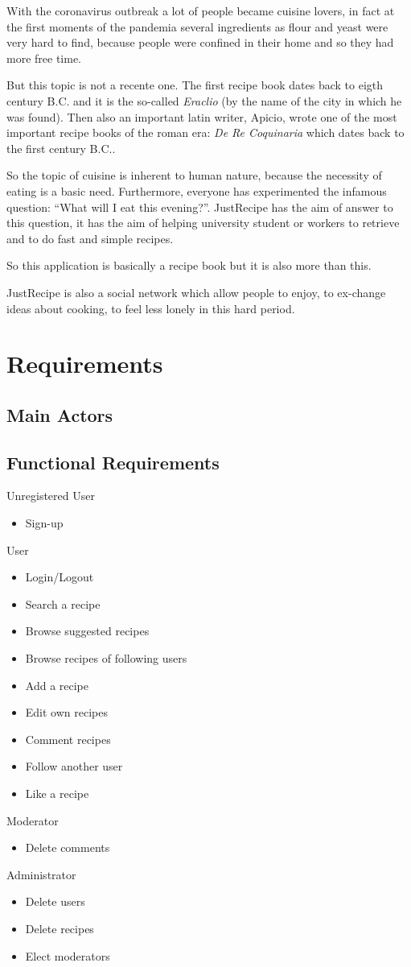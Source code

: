 \documentclass[a4paper]{report}
\begin{document}
\noindent With the coronavirus outbreak a lot of people became cuisine lovers, in fact at the first moments of the pandemia several ingredients as flour and yeast were very hard to find, because people were confined in their home and so they had more free time.

\noindent But this topic is not a recente one. The first recipe book dates back to eigth century B.C. and it is the so-called \emph{Eraclio} (by the name of the city in which he was found). Then also an important latin writer, Apicio, wrote one of the most important recipe books of the roman era: \emph{De Re Coquinaria} which dates back to the first century B.C..
 
\noindent So the topic of cuisine is inherent to human nature, because the necessity of eating is a basic need.
Furthermore, everyone has experimented the infamous question: “What will I eat this evening?”. JustRecipe has the aim of answer to this question, it has the aim of helping university student or workers to retrieve and to do fast and simple recipes.

\noindent So this application is basically a recipe book but it is also more than this.

\noindent JustRecipe is also a social network which allow people to enjoy, to ex-change ideas about cooking, to feel less lonely in this hard period.

\section{Requirements}
\subsection{Main Actors}
\subsection{Functional Requirements}
Unregistered User
\begin{itemize}
	\item Sign-up
\end{itemize}
User
\begin{itemize}
	\item Login/Logout
	\item Search a recipe
	\item Browse suggested recipes
	\item Browse recipes of following users
	\item Add a recipe
	\item Edit own recipes
	\item Comment recipes
	\item Follow another user
	\item Like a recipe
\end{itemize}
Moderator
\begin{itemize}
	\item Delete comments
\end{itemize}
Administrator
\begin{itemize}
	\item Delete users
	\item Delete recipes
	\item Elect moderators
\end{itemize}
\end{document}

